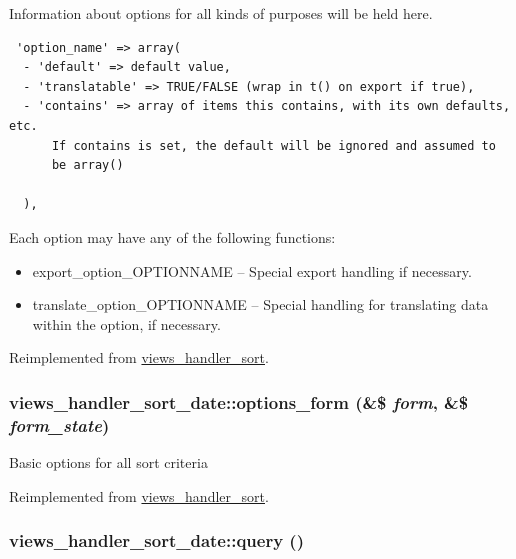 Information about options for all kinds of purposes will be held here. 

\begin{Code}\begin{verbatim} 'option_name' => array(
  - 'default' => default value,
  - 'translatable' => TRUE/FALSE (wrap in t() on export if true),
  - 'contains' => array of items this contains, with its own defaults, etc.
      If contains is set, the default will be ignored and assumed to
      be array()

  ),
\end{verbatim}
\end{Code}

 Each option may have any of the following functions:\begin{itemize}
\item export\_\-option\_\-OPTIONNAME -- Special export handling if necessary.\item translate\_\-option\_\-OPTIONNAME -- Special handling for translating data within the option, if necessary. \end{itemize}


Reimplemented from \hyperlink{classviews__handler__sort_f1e8382befe67b9cd07d0bbfa9b98266}{views\_\-handler\_\-sort}.\hypertarget{classviews__handler__sort__date_622c39d35c93e620cc6fa6ae2ab37ab4}{
\subsubsection[{options\_\-form}]{\setlength{\rightskip}{0pt plus 5cm}views\_\-handler\_\-sort\_\-date::options\_\-form (\&\$ {\em form}, \/  \&\$ {\em form\_\-state})}}
\label{classviews__handler__sort__date_622c39d35c93e620cc6fa6ae2ab37ab4}


Basic options for all sort criteria 

Reimplemented from \hyperlink{classviews__handler__sort_ba953218e09ab9da8f6ed0a67f046455}{views\_\-handler\_\-sort}.\hypertarget{classviews__handler__sort__date_3d3680d96fee82a746bac50c051016a8}{
\subsubsection[{query}]{\setlength{\rightskip}{0pt plus 5cm}views\_\-handler\_\-sort\_\-date::query ()}}
\label{classviews__handler__sort__date_3d3680d96fee82a746bac50c051016a8}


